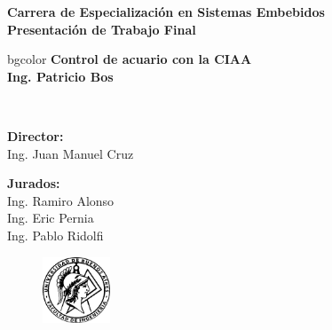 \documentclass[11pt]{beamer}
\begin{document}
\begin{frame}
  \begin{center}
    \vspace{5px}	
    \large\textbf{Carrera de Especialización en Sistemas Embebidos}\\
    \vspace{10px}
    \Large\textbf{Presentación de Trabajo Final}\\
    \vspace{5px}
    \hfill
      \begin{beamercolorbox}[center,dp=2ex,ht=.25\textheight, wd=1\paperwidth]{bgcolor}
        \huge\textbf{Control de acuario con la CIAA}\\
          \vspace{5px}
        \Large\textbf{Ing. Patricio Bos}\\
      \end{beamercolorbox}
    \hfill\hfill
    \\
    \vspace{-5px}
    \begin{minipage}[t]{0.4\textwidth}
      \begin{flushleft} \large
        \textbf{Director:}\\
        Ing. Juan Manuel Cruz\\
      \end{flushleft}
    \end{minipage}
    \begin{minipage}[t]{0.4\textwidth}
      \begin{flushright} \large
        \textbf{Jurados:} \\
        Ing. Ramiro Alonso \\
        Ing. Eric Pernia\\
        Ing. Pablo Ridolfi\\
      \end{flushright}
    \end{minipage}
    \vfill
    \begin{figure}[H]
      \includegraphics[width=2cm]{./imagenes/logo_facu_circle}
    \end{figure}	
    \vspace{5px}
  \end{center}
\end{frame}
\end{document}
